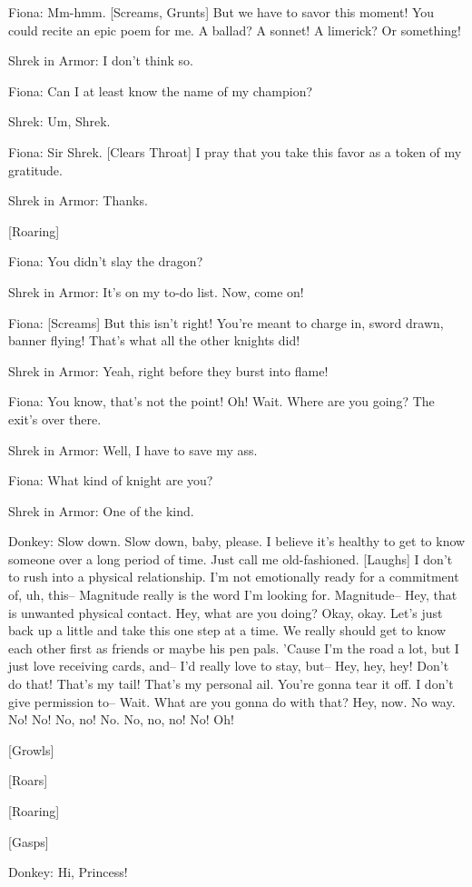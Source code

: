 \documentclass{article}
\begin{document}
Fiona:
Mm-hmm. [Screams, Grunts] But we have to savor this moment! You could recite an epic poem for me. A ballad? A sonnet! A limerick? Or something!

Shrek in Armor:
I don't think so.

Fiona:
Can I at least know the name of my champion?

Shrek:
Um, Shrek.

Fiona:
Sir Shrek. [Clears Throat] I pray that you take this favor as a token of my gratitude.

Shrek in Armor:
Thanks.

[Roaring]

Fiona:
You didn't slay the dragon?

Shrek in Armor:
It's on my to-do list. Now, come on!

Fiona:
[Screams] But this isn't right! You’re meant to charge in, sword drawn, banner flying! That's what all the other knights did!

Shrek in Armor:
Yeah, right before they burst into flame!

Fiona:
You know, that's not the point! Oh! Wait. Where are you going? The exit's over there.

Shrek in Armor:
Well, I have to save my ass.

Fiona:
What kind of knight are you?

Shrek in Armor:
One of the kind.

Donkey:
Slow down. Slow down, baby, please. I believe it's healthy to get to know someone over a long period of time. Just call me old-fashioned. [Laughs] I don't to rush into a physical relationship. I'm not emotionally ready for a commitment of, uh, this-- Magnitude really is the word I'm looking for. Magnitude-- Hey, that is unwanted physical contact. Hey, what are you doing? Okay, okay. Let's just back up a little and take this one step at a time. We really should get to know each other first as friends or maybe his pen pals. 'Cause I'm the road a lot, but I just love receiving cards, and-- I'd really love to stay, but-- Hey, hey, hey! Don't do that! That's my tail! That's my personal ail. You're gonna tear it off. I don't give permission to-- Wait. What are you gonna do with that? Hey, now. No way. No! No! No, no! No. No, no, no! No! Oh!

[Growls]

[Roars]

[Roaring]

[Gasps]

Donkey:
Hi, Princess!
\end{document}
